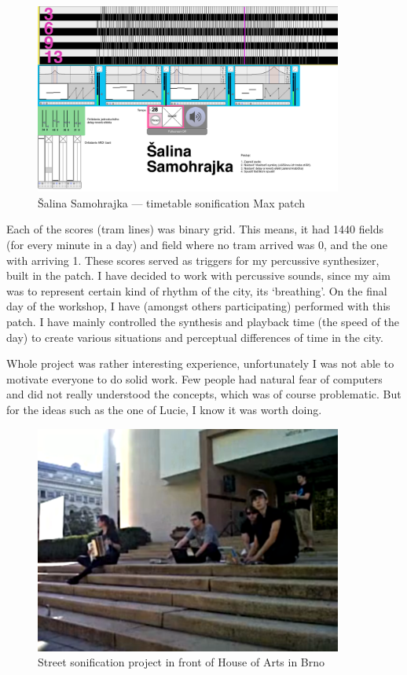 \documentclass[12pt,a4paper,oneside]{report}
\begin{document}
\begin{figure}  
  \centering
    \includegraphics[width=0.9\textwidth]{img/salina}
	\caption{Šalina Samohrajka --- timetable sonification Max patch}
	\label{fig:salina}
\end{figure}

Each of the scores (tram lines) was binary grid. This means, it had 1440 fields (for every minute in a day) and field where no tram arrived was 0, and the one with arriving 1. These scores served as triggers for my percussive synthesizer, built in the patch. I have decided to work with percussive sounds, since my aim was to represent certain kind of rhythm of the city, its `breathing'. On the final day of the workshop, I have (amongst others participating) performed with this patch. I have mainly controlled the synthesis and playback time (the speed of the day) to create various situations and perceptual differences of time in the city. 

Whole project was rather interesting experience, unfortunately I was not able to motivate everyone to do solid work. Few people had natural fear of computers and did not really understood the concepts, which was of course problematic. But for the ideas such as the one of Lucie, I know it was worth doing.

\begin{figure}  
  \centering
    \includegraphics[width=0.9\textwidth]{img/workshop}
	\caption{Street sonification project in front of House of Arts in Brno}
	\label{fig:workshop}
\end{figure}
\end{document}
